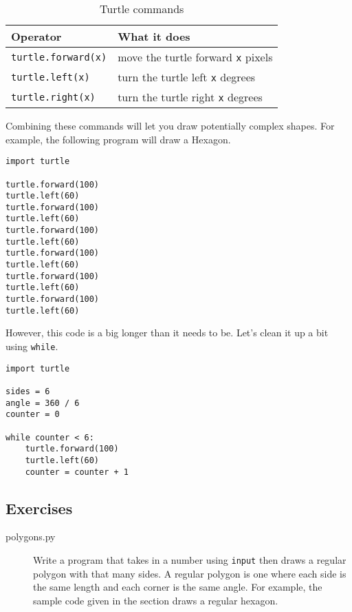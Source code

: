 \documentclass[11pt,hidelinks]{article}
\begin{document}
\begin{table}[h]
  \centering
  \begin{tabular}{ll}
    \toprule
    Operator & What it does\\
    \midrule
    \lstinline!turtle.forward(x)! & move the turtle forward \lstinline!x! pixels \\
    \lstinline!turtle.left(x)! & turn the turtle left \lstinline!x! degrees \\
    \lstinline!turtle.right(x)! & turn the turtle right \lstinline!x! degrees \\
    \bottomrule
  \end{tabular}
  \caption{Turtle commands}
  \label{tab:turtle}
\end{table}

Combining these commands will let you draw potentially complex shapes. For example, the following program will draw a Hexagon.

\begin{lstlisting}[style=python]
import turtle

turtle.forward(100)
turtle.left(60)
turtle.forward(100)
turtle.left(60)
turtle.forward(100)
turtle.left(60)
turtle.forward(100)
turtle.left(60)
turtle.forward(100)
turtle.left(60)
turtle.forward(100)
turtle.left(60)
\end{lstlisting}

However, this code is a big longer than it needs to be. Let's clean it up a bit using \lstinline{while}.

\begin{lstlisting}[style=python]
import turtle

sides = 6
angle = 360 / 6
counter = 0

while counter < 6:
    turtle.forward(100)
    turtle.left(60)
    counter = counter + 1
\end{lstlisting}

\subsection{Exercises}
\label{subsec:turtleex}

\begin{description}
  \item[polygons.py] Write a program that takes in a number using \lstinline{input} then draws a regular polygon with that many sides. A regular polygon is one where each side is the same length and each corner is the same angle. For example, the sample code given in the section draws a regular hexagon.
\end{description}
\end{document}
